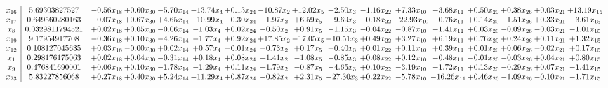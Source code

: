 \documentclass[9pt]{article}
\begin{document}
 \[\begin{array}{c| c c@{\hskip 2pt} c@{\hskip 2pt} c@{\hskip 2pt} c@{\hskip 2pt} c@{\hskip 2pt} c@{\hskip 2pt} c@{\hskip 2pt} c@{\hskip 2pt} c@{\hskip 2pt} c@{\hskip 2pt} c@{\hskip 2pt} c@{\hskip 2pt} c@{\hskip 2pt} c@{\hskip 2pt} c@{\hskip 2pt} }
 x_{16}   &  5.69303827527 & -0.56 x_{18} & +  0.60 x_{30} & -5.70 x_{14} & -13.74 x_{4} & +  0.13 x_{24} & -10.87 x_{2} & + 12.02 x_{5} & +  2.50 x_{3} & -1.16 x_{22} & +  7.33 x_{10} & -3.68 x_{11} & +  0.50 x_{20} & +  0.38 x_{26} & +  0.03 x_{21} & + 13.19 x_{15}\\
 x_{17}   &  0.649560280163 & -0.07 x_{18} & +  0.67 x_{30} & +  4.65 x_{14} & -10.99 x_{4} & -0.30 x_{24} & -1.97 x_{2} & +  6.59 x_{5} & -9.69 x_{3} & -0.18 x_{22} & -22.93 x_{10} & -0.76 x_{11} & +  0.14 x_{20} & -1.51 x_{26} & +  0.33 x_{21} & -3.61 x_{15}\\
 x_{8}   &  0.0329811794521 & +  0.02 x_{18} & +  0.05 x_{30} & -0.06 x_{14} & -1.03 x_{4} & +  0.02 x_{24} & -0.50 x_{2} & +  0.91 x_{5} & -1.15 x_{3} & -0.04 x_{22} & -0.87 x_{10} & -1.41 x_{11} & +  0.03 x_{20} & -0.09 x_{26} & -0.03 x_{21} & -1.01 x_{15}\\
 x_{19}   &  9.17954917708 & -0.36 x_{18} & +  0.10 x_{30} & -4.26 x_{14} & -1.77 x_{4} & +  0.92 x_{24} & + 17.85 x_{2} & -17.05 x_{5} & -10.51 x_{3} & +  0.49 x_{22} & +  3.27 x_{10} & +  6.19 x_{11} & +  0.76 x_{20} & +  0.24 x_{26} & +  0.11 x_{21} & +  1.32 x_{15}\\
 x_{12}   &  0.108127045635 & +  0.03 x_{18} & -0.00 x_{30} & +  0.02 x_{14} & +  0.57 x_{4} & -0.01 x_{24} & -0.73 x_{2} & +  0.17 x_{5} & +  0.40 x_{3} & +  0.01 x_{22} & +  0.11 x_{10} & +  0.39 x_{11} & +  0.01 x_{20} & +  0.06 x_{26} & -0.02 x_{21} & +  0.17 x_{15}\\
 x_{1}   &  0.298176175063 & +  0.02 x_{18} & +  0.04 x_{30} & -0.31 x_{14} & +  0.18 x_{4} & +  0.08 x_{24} & +  1.41 x_{2} & -1.08 x_{5} & -0.85 x_{3} & +  0.08 x_{22} & +  0.12 x_{10} & -0.48 x_{11} & -0.01 x_{20} & -0.03 x_{26} & +  0.04 x_{21} & +  0.80 x_{15}\\
 x_{9}   &  0.476841690001 & +  0.06 x_{18} & +  0.10 x_{30} & -1.78 x_{14} & -1.29 x_{4} & +  0.11 x_{24} & +  1.79 x_{2} & -0.87 x_{5} & -4.65 x_{3} & +  0.10 x_{22} & -3.19 x_{10} & -1.72 x_{11} & +  0.13 x_{20} & -0.29 x_{26} & +  0.07 x_{21} & -1.41 x_{15}\\
 x_{23}   &  5.83227856068 & +  0.27 x_{18} & +  0.40 x_{30} & +  5.24 x_{14} & -11.29 x_{4} & +  0.87 x_{24} & -0.82 x_{2} & +  2.31 x_{5} & -27.30 x_{3} & +  0.22 x_{22} & -5.78 x_{10} & -16.26 x_{11} & +  0.46 x_{20} & -1.09 x_{26} & -0.10 x_{21} & -1.71 x_{15}\\

\end{array}\]
\end{document}
